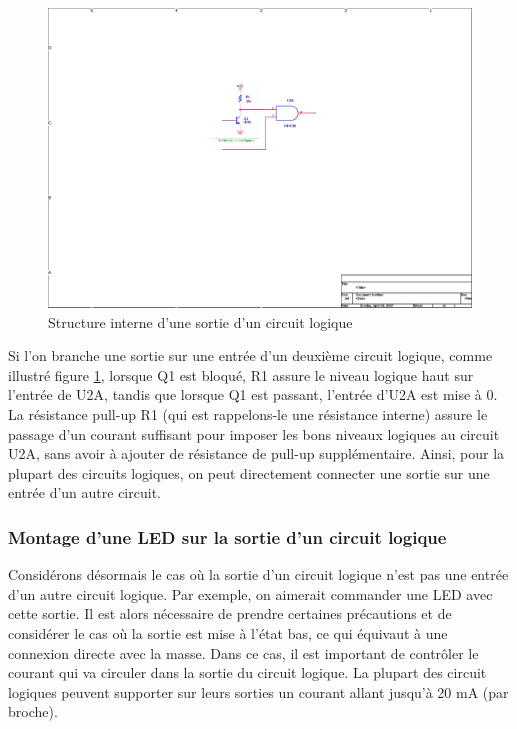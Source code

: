 \documentclass[a4paper]{article}
\begin{document}
\begin{figure}[H]
	\centering
	\includegraphics[scale=1.00]{Images/Montage_sortie_circuit_logique}
	\caption{Structure interne d'une sortie d'un circuit logique
		\label{Montage_sortie_circuit_logique}}
\end{figure}

Si l'on branche une sortie sur une entrée d'un deuxième circuit logique, comme illustré figure \ref{Montage_sortie_circuit_logique}, lorsque Q1 est bloqué, R1 assure le niveau logique haut sur l'entrée de U2A, tandis que lorsque Q1 est passant, l'entrée d'U2A est mise à 0. La résistance pull-up R1 (qui est rappelons-le une résistance interne) assure le passage d'un courant suffisant pour imposer les bons niveaux logiques au circuit U2A, sans avoir à ajouter de résistance de pull-up supplémentaire. Ainsi, pour la plupart des circuits logiques, on peut directement connecter une sortie sur une entrée d'un autre circuit.

\subsubsection{Montage d'une LED sur la sortie d'un circuit logique}

Considérons désormais le cas où la sortie d'un circuit logique n'est pas une entrée d'un autre circuit logique. Par exemple, on aimerait commander une \ac{LED} avec cette sortie. Il est alors nécessaire de prendre certaines précautions et de considérer le cas où la sortie est mise à l'état bas, ce qui équivaut à une connexion directe avec la masse. Dans ce cas, il est important de contrôler le courant qui va circuler dans la sortie du circuit logique. La plupart des circuit logiques peuvent supporter sur leurs sorties un courant allant jusqu'à 20 mA (par broche).
\end{document}
